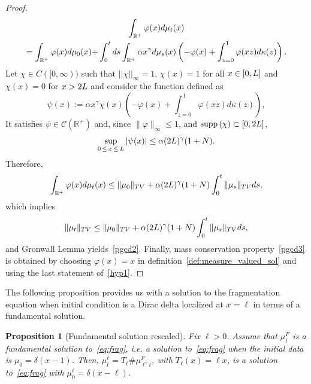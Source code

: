 \documentclass[10pt,a4paper]{amsart}
\numberwithin{equation}{section}
\newcommand*\dst{\displaystyle}
\newcommand*\R{\mathbb{R}}
\newcommand{\clC}{\mathcal{C}}
\newcommand{\MT}[1]{{\textcolor{black}{#1}}}
\newcommand*\supp{{\mbox{\small\rm supp}}\,}
\newtheorem{prop}[defi]{Proposition}
\begin{document}
\begin{proof}
\begin{multline*}
\int_{\R^+} \varphi(x) d\mu_t(x)\\
=\MT{\int_{\R^+} \varphi(x) d\mu_0(x)+}\dst\int_0^t ds \dst\int_{\R^+} \alpha x^{\gamma} d\mu_s(x) \left(- \varphi(x) + \dst\int_{z=0}^{1} \varphi(xz)d\kappa(z)\right).
\end{multline*}
Let $\chi\in C([0, \infty))$ such that $||\chi||_\infty=1$, $\chi(x)=1$ for all $x\in [0, \MT{L}]$ and $\chi(x)=0$ for $x>2\MT{L}$ and consider the function defined as
\begin{equation*}
\psi(x) := \alpha x^{\gamma}\chi(x) \left(- \varphi(x) + \dst\int_{z=0}^{1} \varphi(xz)d\kappa(z)\right),
\end{equation*}
It satisfies $ \psi \in \clC(\R^+)$ and, since $\|\varphi\|_{\infty} \leq 1$, and $\supp(\chi)\subset [0, 2 \MT{L}]$,
\begin{equation*}
\sup_{0\,\le\,x\,\le\,L} |\psi\MT{(x)}|\leq \alpha (2 \MT{L})^{\gamma} (1+N).
\end{equation*}
Therefore,
\begin{equation*}
\int_{\R^+} \varphi(x) d\mu_t(x)\leq \|\mu_0\|_{TV}+ \alpha (2\MT{L})^{\gamma} (1+N) \dst\int_0^t \|\mu_s\|_{TV} ds,
\end{equation*}
which implies
\begin{equation*}
\|\mu_t\|_{TV}\leq \|\mu_0\|_{TV}+ \alpha (2\MT{L})^{\gamma} (1+N) \dst\int_0^t \|\mu_s\|_{TV} ds,
\end{equation*}
and Gronwall Lemma yields~\eqref{pgcd2}. Finally, mass conservation property~\eqref{pgcd3} is obtained by choosing $\varphi(x)=x$ in definition~\ref{def:measure_valued_sol}
and using the last statement of~\eqref{hyp1}.
\end{proof}

The following proposition provides us with a solution to the fragmentation equation when initial condition is a Dirac delta localized at $x=\ell$ in terms of a fundamental solution.

\begin{prop}[Fundamental solution rescaled]\label{prop:rescaling}
Fix $\ell>0$.
Assume that $\mu_t^{F}$ is a fundamental solution to~\eqref{eq:frag}, i.e. a solution to~\eqref{eq:frag} when the initial data is $\mu_0=\delta(x-1)$. Then, $\mu_t^{\ell} = T_{\ell} \# \mu_{\ell^{\gamma}t}^{F}$, with $T_{\ell}(x)= \ell x$, is a solution to~\eqref{eq:frag} with $\mu_0^{\ell}=\delta(x-\ell)$.
\end{prop}
\end{document}
